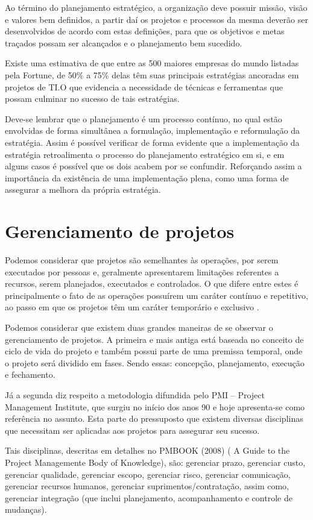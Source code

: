 \documentclass[12pt,a4paper,ruledheader,tocpage=prefix,floatnumber=continuous,pagestart=folhaderosto,font=times]{abnt}
\begin{document}
Ao término do planejamento estratégico, a organização deve possuir missão, visão e valores bem definidos, a partir daí os projetos e processos da mesma
deverão ser desenvolvidos de acordo com estas definições, para que os objetivos e metas traçados possam ser alcançados e o planejamento bem sucedido.

Existe uma estimativa de que entre as 500 maiores empresas do mundo listadas pela Fortune, de 50\% a 75\% delas têm suas principais estratégias ancoradas 
em projetos de TI.O que evidencia a necessidade de técnicas e ferramentas que possam culminar no sucesso de tais estratégias.

Deve-se lembrar que o planejamento é um processo contínuo, no qual estão envolvidas de forma simultânea a formulação, implementação e reformulação da
estratégia. Assim é possível verificar de forma evidente que a implementação da estratégia retroalimenta o processo do planejamento estratégico em si, 
e em alguns casos é possível que os dois acabem por se confundir. Reforçando assim a importância da existência de uma implementação plena, como uma forma
de assegurar a melhora da própria estratégia.

\chapter{Gerenciamento de projetos}
Podemos considerar que projetos são semelhantes às operações, por serem executados por pessoas e, geralmente apresentarem limitações referentes a recursos,
serem planejados, executados e controlados. O que difere entre estes é principalmente o fato de as operações possuírem um caráter contínuo e repetitivo, ao
passo em que os projetos têm um caráter temporário e exclusivo \cite{SPPM2008}.

Podemos considerar que existem duas grandes maneiras de se observar o gerenciamento de projetos. A primeira e mais antiga está baseada no conceito de 
ciclo de vida do projeto e também possui parte de uma premissa temporal, onde o projeto será dividido em fases. Sendo essas: concepção, planejamento,
execução e fechamento.

Já a segunda diz respeito a metodologia difundida pelo PMI – Project Management Institute, que surgiu no início dos anos 90 e hoje apresenta-se como
referência no assunto. Esta parte do pressuposto que existem diversas disciplinas que necessitam ser aplicadas aos projetos para assegurar seu sucesso.

Tais disciplinas, descritas em detalhes no PMBOOK (2008) ( A Guide to the Project Managemente Body of Knowledge), são: gerenciar prazo, gerenciar custo,
gerenciar qualidade, gerenciar escopo, gerenciar risco, gerenciar comunicação, gerenciar recursos humanos, gerenciar suprimentos/contratação, assim como,
gerenciar integração (que inclui planejamento, acompanhamento e controle de mudanças).
\end{document}
